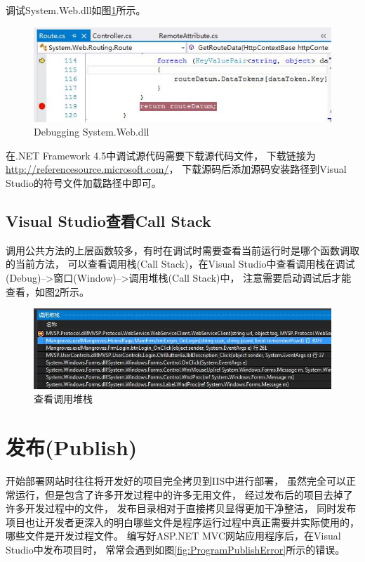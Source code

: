 \documentclass{book}
\begin{document}
调试System.Web.dll如图\ref{fig:DebuggingSystemWebDll}所示。

\begin{figure}[htbp]
	\centering
	\includegraphics[scale=0.6]{DebuggingSystemWebDll.jpg}
	\caption{Debugging System.Web.dll}
	\label{fig:DebuggingSystemWebDll}
\end{figure}

在.NET Framework 4.5中调试源代码需要下载源代码文件，
下载链接为\url{http://referencesource.microsoft.com/}，
下载源码后添加源码安装路径到Visual Studio的符号文件加载路径中即可。


\subsection{Visual Studio查看Call Stack}

调用公共方法的上层函数较多，有时在调试时需要查看当前运行时是哪个函数调取的当前方法，
可以查看调用栈(Call Stack)，在Visual Studio中查看调用栈在调试(Debug)-->窗口(Window)-->调用堆栈(Call Stack)中，
注意需要启动调试后才能查看，如图\ref{fig:CSharpDebugCallStack}所示。

\begin{figure}[htbp]
	\centering
	\includegraphics[scale=0.6]{CSharpDebugCallStack.jpg}
	\caption{查看调用堆栈}
	\label{fig:CSharpDebugCallStack}
\end{figure}


\section{发布(Publish)}

开始部署网站时往往将开发好的项目完全拷贝到IIS中进行部署，
虽然完全可以正常运行，但是包含了许多开发过程中的许多无用文件，
经过发布后的项目去掉了许多开发过程中的文件，
发布目录相对于直接拷贝显得更加干净整洁，
同时发布项目也让开发者更深入的明白哪些文件是程序运行过程中真正需要并实际使用的，
哪些文件是开发过程文件。
编写好ASP.NET MVC网站应用程序后，在Visual Studio中发布项目时，
常常会遇到如图\ref{fig:ProgramPublishError}所示的错误。
\end{document}
